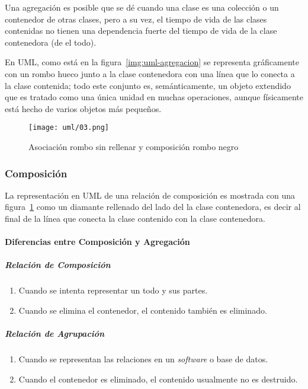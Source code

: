 Una agregación es posible que se dé cuando una clase es una colección o un contenedor de otras clases, pero a su vez, el tiempo de vida de las clases contenidas no tienen una dependencia fuerte del tiempo de vida de la clase contenedora (de el todo). 


En UML, como está en la figura~\ref{img:uml-agregacion} se representa gráficamente con un rombo hueco junto a la clase contenedora con una línea que lo conecta a la clase contenida; todo este conjunto es, semánticamente, un objeto extendido que es tratado como una única unidad en muchas operaciones, aunque físicamente está hecho de varios objetos más pequeños.

\begin{figure}[H] 
    \centering
    \texttt{[image: uml/03.png]}
    \caption{Asociación rombo sin rellenar y composición rombo negro}
    \label{img:uml-composicion}
\end{figure}

\subsubsection*{Composición}

La representación en UML de una relación de composición es mostrada con una figura~\ref{img:uml-composicion} como un diamante rellenado del lado del la clase contenedora, es decir al final de la línea que conecta la clase contenido con la clase contenedora.


\paragraph*{Diferencias entre Composición y Agregación}

\subparagraph*{Relación de Composición}

\begin{enumerate}
    \item Cuando se intenta representar un todo y sus partes.
    \item Cuando se elimina el contenedor, el contenido también es eliminado.
\end{enumerate}


\subparagraph*{Relación de Agrupación}

\begin{enumerate}
    \item Cuando se representan las relaciones en un \textit{software} o base de datos. 
    \item Cuando el contenedor es eliminado, el contenido usualmente no es destruido.
\end{enumerate}